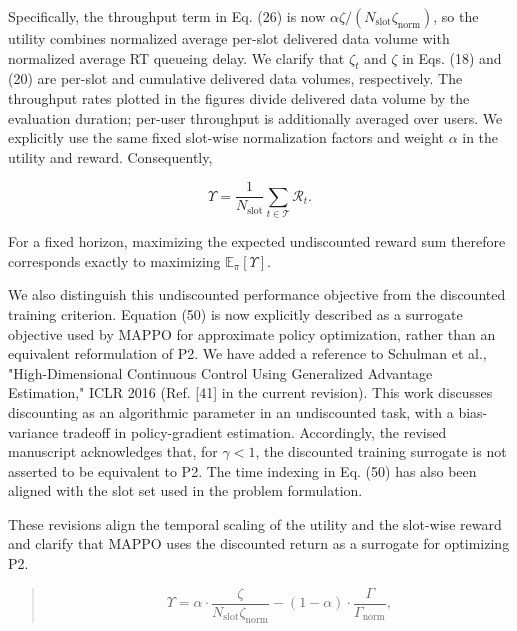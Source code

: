 \documentclass[11pt,a4paper]{article}
\begin{document}
Specifically, the throughput term in Eq. (26) is now $\alpha\zeta/(N_{\mathrm{slot}}\zeta_{\mathrm{norm}})$, so the utility combines normalized average per-slot delivered data volume with normalized average RT queueing delay. We clarify that $\zeta_t$ and $\zeta$ in Eqs. (18) and (20) are per-slot and cumulative delivered data volumes, respectively. The throughput rates plotted in the figures divide delivered data volume by the evaluation duration; per-user throughput is additionally averaged over users. We explicitly use the same fixed slot-wise normalization factors and weight $\alpha$ in the utility and reward. Consequently,
\par

\[
\Upsilon=\frac{1}{N_{\mathrm{slot}}}\sum_{t\in\mathcal T}\mathcal R_t.
\]

For a fixed horizon, maximizing the expected undiscounted reward sum therefore corresponds exactly to maximizing $\mathbb E_\pi[\Upsilon]$.
\par

We also distinguish this undiscounted performance objective from the discounted training criterion. Equation (50) is now explicitly described as a surrogate objective used by MAPPO for approximate policy optimization, rather than an equivalent reformulation of P2. We have added a reference to Schulman et al., "High-Dimensional Continuous Control Using Generalized Advantage Estimation," ICLR 2016 (Ref. [41] in the current revision). This work discusses discounting as an algorithmic parameter in an undiscounted task, with a bias-variance tradeoff in policy-gradient estimation. Accordingly, the revised manuscript acknowledges that, for $\gamma<1$, the discounted training surrogate is not asserted to be equivalent to P2. The time indexing in Eq. (50) has also been aligned with the slot set used in the problem formulation.
\par

These revisions align the temporal scaling of the utility and the slot-wise reward and clarify that MAPPO uses the discounted return as a surrogate for optimizing P2.
\par


\begin{quote}\small\color{revisionblue}
\begin{equation*}
\Upsilon=
\alpha\cdot\frac{\zeta}{N_{\mathrm{slot}}\zeta_{\mathrm{norm}}}
-
(1-\alpha)\cdot\frac{\Gamma}{\Gamma_{\mathrm{norm}}},
\tag{26}\end{equation*}
\end{quote}
\end{document}
